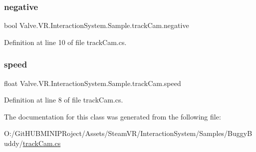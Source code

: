 \subsubsection{\texorpdfstring{negative}{negative}}
{\footnotesize\ttfamily bool Valve.\+V\+R.\+Interaction\+System.\+Sample.\+track\+Cam.\+negative}



Definition at line 10 of file track\+Cam.\+cs.

\mbox{\label{class_valve_1_1_v_r_1_1_interaction_system_1_1_sample_1_1track_cam_a3be7ac641bae5c15792a9211f2018a72}} 
\subsubsection{\texorpdfstring{speed}{speed}}
{\footnotesize\ttfamily float Valve.\+V\+R.\+Interaction\+System.\+Sample.\+track\+Cam.\+speed}



Definition at line 8 of file track\+Cam.\+cs.



The documentation for this class was generated from the following file\+:\begin{DoxyCompactItemize}
\item 
O\+:/\+Git\+H\+U\+B\+M\+I\+N\+I\+P\+Roject/\+Assets/\+Steam\+V\+R/\+Interaction\+System/\+Samples/\+Buggy\+Buddy/\mbox{\hyperlink{track_cam_8cs}{track\+Cam.\+cs}}\end{DoxyCompactItemize}
